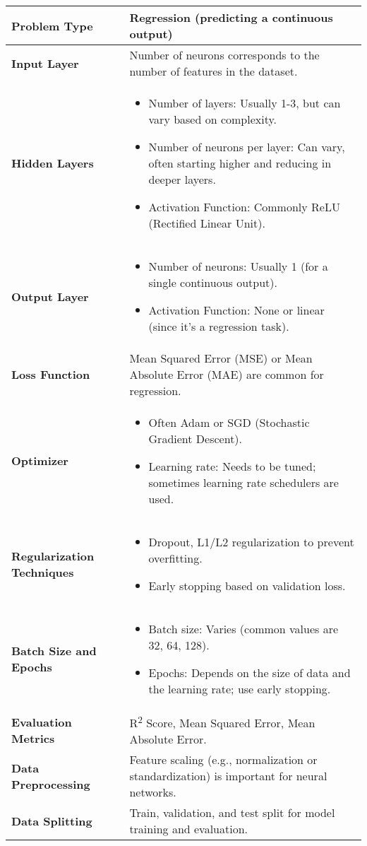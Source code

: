 \documentclass{article}
\begin{document}
\begin{tabular}{>{\bfseries}l p{10cm}}
\toprule
Problem Type & Regression (predicting a continuous output) \\
\midrule
Input Layer & Number of neurons corresponds to the number of features in the dataset. \\
\midrule
Hidden Layers & \begin{itemize}
    \item Number of layers: Usually 1-3, but can vary based on complexity.
    \item Number of neurons per layer: Can vary, often starting higher and reducing in deeper layers.
    \item Activation Function: Commonly ReLU (Rectified Linear Unit).
\end{itemize} \\
\midrule
Output Layer & \begin{itemize}
    \item Number of neurons: Usually 1 (for a single continuous output).
    \item Activation Function: None or linear (since it's a regression task).
\end{itemize} \\
\midrule
Loss Function & Mean Squared Error (MSE) or Mean Absolute Error (MAE) are common for regression. \\
\midrule
Optimizer & \begin{itemize}
    \item Often Adam or SGD (Stochastic Gradient Descent).
    \item Learning rate: Needs to be tuned; sometimes learning rate schedulers are used.
\end{itemize} \\
\midrule
Regularization Techniques & \begin{itemize}
    \item Dropout, L1/L2 regularization to prevent overfitting.
    \item Early stopping based on validation loss.
\end{itemize} \\
\midrule
Batch Size and Epochs & \begin{itemize}
    \item Batch size: Varies (common values are 32, 64, 128).
    \item Epochs: Depends on the size of data and the learning rate; use early stopping.
\end{itemize} \\
\midrule
Evaluation Metrics & R\textsuperscript{2} Score, Mean Squared Error, Mean Absolute Error. \\
\midrule
Data Preprocessing & Feature scaling (e.g., normalization or standardization) is important for neural networks. \\
\midrule
Data Splitting & Train, validation, and test split for model training and evaluation. \\
\bottomrule
\end{tabular}
\end{document}
